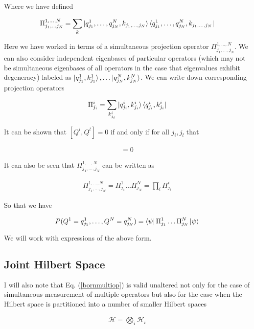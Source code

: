 \documentclass[12pt]{article}
\begin{document}
Where we have defined

\begin{align}
\Pi^{1,\ldots, N}_{j_1, \ldots j_N} = \sum_{k} \ket{q^1_{j_1}, \ldots, q^N_{j_N}, k_{j_1,\ldots,j_N}}\bra{q^1_{j_1}, \ldots, q^N_{j_N}, k_{j_1,\ldots,j_N}}
\end{align}

Here we have worked in terms of a simultaneous projection operator $\Pi^{1,\ldots,N}_{j_1,\ldots,j_N}$. 
We can also consider independent eigenbases of particular operators (which may not be simultaneous eigenbases of all operators in the case that eigenvalues exhibit degeneracy) labeled as $\ket{q^1_{j_1}, k^1_{j_1} }, \ldots \ket{q^N_{j_N}, k^N_{j_N}}$.
We can write down corresponding projection operators

\begin{align}
\Pi^i_{j_i} = \sum_{k^i_{j_i}} \ket{q^i_{j_i}, k^i_{j_i}}\bra{q^i_{j_i},k^i_{j_i}}
\end{align}

It can be shown that $[Q^i, Q^l]=0$ if and only if for all $j_i, j_l$ that

\begin{align}
[\Pi^i_{j_i}, \Pi^l_{j_l}] = 0
\end{align}

It can also be seen that $\Pi^{1, \ldots, N}_{j_1, \ldots, j_N}$ can be written as

\begin{align}
\Pi^{1, \ldots, N}_{j_1, \ldots, j_N} = \Pi^1_{j_1}\ldots \Pi^N_{j_N} = \prod_i \Pi^i_{j_i}
\end{align}

So that we have

\begin{align}
\label{bornmultiop}
P(Q^1=q^1_{j_1}, \ldots, Q^N=q^N_{j_N}) = \bra{\psi}\Pi^1_{j_1} \ldots \Pi^N_{j_N}\ket{\psi}
\end{align}

We will work with expressions of the above form.

\subsection{Joint Hilbert Space} 
I will also note that Eq. (\ref{bornmultiop}) is valid unaltered not only for the case of simultaneous measurement of multiple operators but also for the case when the Hilbert space is partitioned into a number of smaller Hilbert spaces

\begin{align}
\mathcal{H} = \bigotimes_i \mathcal{H}_i
\end{align}
\end{document}
